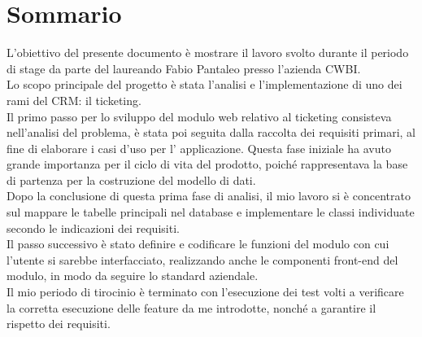 \cleardoublepage
{}
{}
\begingroup
\let\clearpage\relax
\let\cleardoublepage\relax
\let\cleardoublepage\relax

\chapter*{Sommario}

L'obiettivo del presente documento è mostrare il lavoro svolto durante il periodo di stage da parte del laureando Fabio Pantaleo presso l'azienda CWBI\glsfirstoccur .\\
Lo scopo principale del progetto è stata l'analisi e l'implementazione di uno dei rami del CRM\glsfirstoccur \;: il ticketing\glsfirstoccur . \\

\noindent
Il primo passo per lo sviluppo del modulo web relativo al ticketing consisteva nell'analisi del problema, è stata poi seguita dalla raccolta dei requisiti primari, al fine di elaborare i casi d'uso per l' applicazione. Questa fase iniziale ha avuto grande importanza per il ciclo di vita del prodotto, poiché rappresentava la base di partenza per la costruzione del modello di dati. \\
Dopo la conclusione di questa prima fase di analisi, il mio lavoro si è concentrato sul mappare le tabelle principali nel database e implementare le classi individuate secondo le indicazioni dei requisiti.\\
Il passo successivo è stato definire e codificare le funzioni del modulo con cui l'utente si sarebbe interfacciato, realizzando anche le componenti front-end del modulo, in modo da seguire lo standard aziendale.\\

\noindent
Il mio periodo di tirocinio è terminato con l'esecuzione dei test volti a verificare la corretta esecuzione delle feature da me introdotte, nonché a garantire il rispetto dei requisiti.





\endgroup

\vfill
